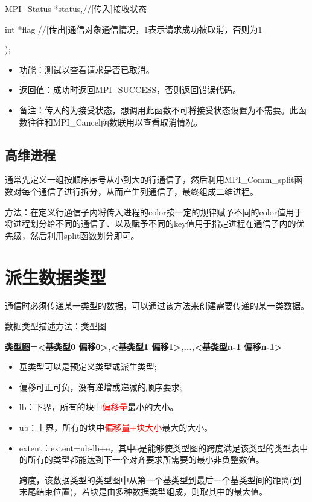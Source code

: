 \documentclass[UTF8]{article}%
\begin{document}
    \qquad MPI\_Status *status,//[传入]接收状态

    \qquad int         *flag //[传出]通信对象通信情况，1表示请求成功被取消，否则为1

);

\begin{itemize}
    \item 功能：测试以查看请求是否已取消。
    \item 返回值：成功时返回MPI\_SUCCESS，否则返回错误代码。
    \item 备注：传入的为接受状态，想调用此函数不可将接受状态设置为不需要。此函数往往和MPI\_Cancel函数联用以查看取消情况。
\end{itemize}

\subsection{高维进程}

通常先定义一组按顺序序号从小到大的行通信子，然后利用MPI\_Comm\_split函数对每个通信子进行拆分，从而产生列通信子，最终组成二维进程。

方法：在定义行通信子内将传入进程的color按一定的规律赋予不同的color值用于将进程划分给不同的通信子、以及赋予不同的key值用于指定进程在通信子内的优先级，然后利用split函数划分即可。

\section{派生数据类型}

通信时必须传递某一类型的数据，可以通过该方法来创建需要传递的某一类数据。

数据类型描述方法：类型图 

\textbf{类型图={<基类型0 偏移0>,<基类型1 偏移1>,...,<基类型n-1 偏移n-1>} }

\begin{itemize}
    \item 基类型可以是预定义类型或派生类型;
    \item 偏移可正可负，没有递增或递减的顺序要求;
    \item lb：下界，所有的块中\textcolor{red}{偏移量}最小的大小。
    \item ub：上界，所有的块中\textcolor{red}{偏移量+块大小}最大的大小。
    \item extent：extent=ub-lb+e，其中e是能够使类型图的跨度满足该类型的类型表中的所有的类型都能达到下一个对齐要求所需要的最小非负整数值。
    
    跨度，该数据类型的类型图中从第一个基类型到最后一个基类型间的距离(到末尾结束位置)，若块是由多种数据类型组成，则取其中的最大值。

\end{itemize}
\end{document}
